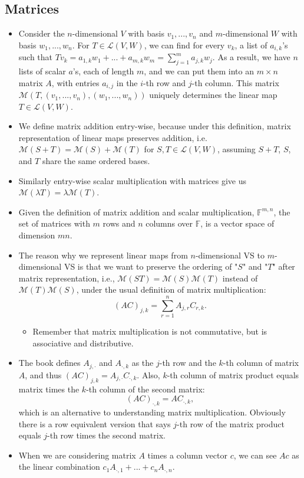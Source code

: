 \documentclass{article}
\newcommand{\F}{\mathbb{F}}
\newcommand{\LVW}{\mathcal{L}(V,W)}
\newcommand{\M}{\mathcal{M}}
\newcommand{\bv}{v_1,...,v_n}
\newcommand{\bw}{w_1,...,w_n}
\begin{document}
\subsection{Matrices}
\begin{itemize}
    \item Consider the $n$-dimensional $V$ with basis $\bv$ and $m$-dimensional $W$ with basis $\bw$. For $T \in \LVW$, we can find for every $v_k$, a list of $a_{i,k}$'s such that $Tv_k = a_{1,k}w_1 +...+ a_{m,k}w_m = \sum_{j=1}^m a_{j,k}w_j$. As a result, we have $n$ lists of scalar $a$'s, each of length $m$, and we can put them into an $m \times n$ matrix $A$, with entries $a_{i,j}$ in the $i$-th row and $j$-th column. This matrix $\mathcal{M}(T,(\bv),(\bw))$ uniquely determines the linear map $T \in \LVW$.
    \item We define matrix addition entry-wise, because under this definition, matrix representation of linear maps preserves addition, i.e. $\M(S+T) = \M(S) + \M(T)$ for $S,T \in \LVW$, assuming $S+T$, $S$, and $T$ share the same ordered bases.
    \item Similarly entry-wise scalar multiplication with matrices give us $\M(\lambda T) = \lambda \M(T)$.
    \item Given the definition of matrix addition and scalar multiplication, $\F^{m,n}$, the set of matrices with $m$ rows and $n$ columns over $\F$, is a vector space of dimension $mn$.
    \item The reason why we represent linear maps from $n$-dimensional VS to $m$-dimensional VS is that we want to preserve the ordering of "$S$" and "$T$" after matrix representation, i.e., $\M(ST) = \M(S)\M(T)$ instead of $\M(T)\M(S)$, under the usual definition of matrix multiplication: $$(AC)_{j,k} = \sum_{r = 1}^n A_{j,r}C_{r,k}.$$
    \begin{itemize}
        \item Remember that matrix multiplication is not commutative, but is associative and distributive.
    \end{itemize}
    \item The book defines $A_{j,\cdot}$ and $A_{\cdot,k}$ as the $j$-th row and the $k$-th column of matrix $A$, and thus $(AC)_{j,k} = A_{j,\cdot}C_{\cdot,k}$. Also, $k$-th column of matrix product equals matrix times the $k$-th column of the second matrix: $$(AC)_{\cdot,k} = AC_{\cdot,k},$$ which is an alternative to understanding matrix multiplication. Obviously there is a row equivalent version that says $j$-th row of the matrix product equals $j$-th row times the second matrix.
    \item When we are considering matrix $A$ times a column vector $c$, we can see $Ac$ as the linear combination $c_1A_{\cdot,1} + ... + c_nA_{\cdot,n}$.
\end{itemize}
\end{document}
